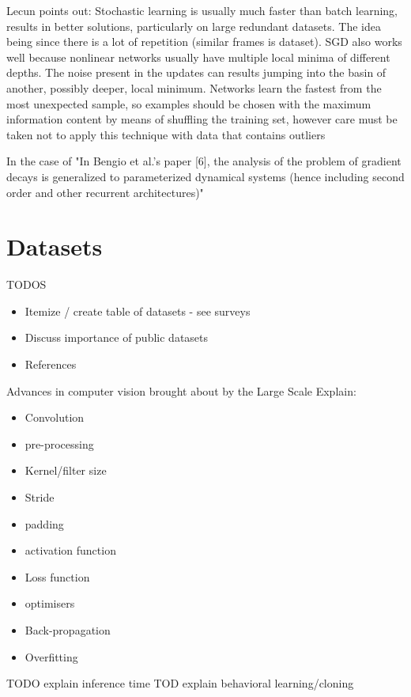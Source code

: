 \cite{lecun2012efficient}
Lecun points out:
Stochastic learning is usually much faster than batch learning, results in better solutions, particularly on large redundant datasets. The idea being since there is a lot of repetition (similar frames is dataset). SGD also works well because nonlinear networks usually have multiple local minima of different depths. The noise present in the updates can results jumping into the basin of another, possibly deeper, local minimum. Networks learn the fastest from the most unexpected sample, so examples should be chosen with the maximum information content by means of shuffling the training set, however care must be taken not to apply this technique with data that contains outliers

In the case of "In Bengio et al.’s paper [6], the analysis of the problem of gradient decays
is generalized to parameterized dynamical systems (hence including second
order and other recurrent architectures)" \cite{hochreiter2001gradient}

\section{Datasets}

TODOS

\begin{itemize}
    \item Itemize / create table of datasets - see surveys
    \item Discuss importance of public datasets
    \item References
\end{itemize}

Advances in computer vision brought about by the Large Scale 
Explain:  
\begin{itemize}
    \item Convolution
    \item pre-processing
    \item Kernel/filter size
    \item Stride
    \item padding
    \item activation function
    \item Loss function
    \item optimisers
    \item Back-propagation
    \item Overfitting    
\end{itemize}

TODO explain inference time
TOD explain behavioral learning/cloning


